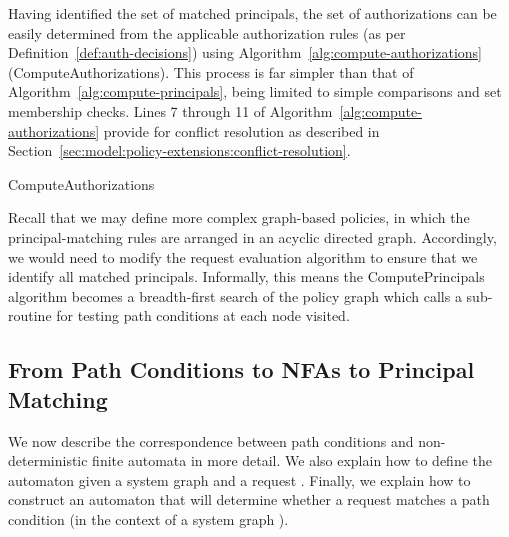 \documentclass{article}
\begin{document}
Having identified the set of matched principals, the set of authorizations can be easily determined from the applicable authorization rules (as per Definition~\ref{def:auth-decisions}) using Algorithm~\ref{alg:compute-authorizations} (\textsf{ComputeAuthorizations}).
This process is far simpler than that of Algorithm~\ref{alg:compute-principals}, being limited to simple comparisons and set membership checks.
Lines 7 through 11 of Algorithm~\ref{alg:compute-authorizations} provide for conflict resolution as described in Section~\ref{sec:model:policy-extensions:conflict-resolution}.

\begin{algorithm}[t]
\footnotesize
    \caption{\textsf{ComputeAuthorizations}}
    \label{alg:compute-authorizations}
    \begin{algorithmic}[1]
            \STATE{}
            \FOR{} \IF{ \AND  \AND }
                    \STATE{}
                \ENDIF
            \ENDFOR
            \IF{( \AND }
                \STATE{}
            \ELSIF{ \AND }
                \STATE{}
            \ENDIF
    \end{algorithmic}
\end{algorithm}

Recall that we may define more complex graph-based policies, in which the principal-matching rules are arranged in an acyclic directed graph.
Accordingly, we would need to modify the request evaluation algorithm to ensure that we identify all matched principals.
Informally, this means the \textsf{ComputePrincipals} algorithm becomes a breadth-first search of the policy graph which calls a sub-routine for testing path conditions at each node visited.

\subsection{From Path Conditions to NFAs to Principal Matching}\label{sec:requests:path-conditions-to-principal-matching}

We now describe the correspondence between path conditions and non-deterministic finite automata in more detail.
We also explain how to define the automaton  given a system graph  and a request .
Finally, we explain how to construct an automaton that will determine whether a request  matches a path condition  (in the context of a system graph ).
\end{document}
